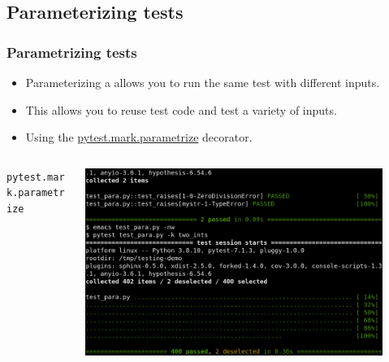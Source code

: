 \documentclass[t]{beamer}
\begin{document}
\subsection{Parameterizing tests}
\begin{frame}[fragile=singleslide]
  \frametitle{Parametrizing tests}

   \begin{itemize}
   \item Parameterizing a allows you to run the same test with different
     inputs.
   \item This allows you to reuse test code and test a variety of inputs.
   \item Using the
     \href{https://docs.pytest.org/en/6.2.x/parametrize.html}{pytest.mark.parametrize}
     decorator.
   \end{itemize}

  \begin{columns}[T]
    \begin{column}{.5\textwidth}
      \vspace{-5pt}
      \begin{exampleblock}{\small \texttt{pytest.mark.parametrize}}
        \inputminted[fontsize=\scriptsize]{python}{code/parametrized_test.py}
      \end{exampleblock}
    \end{column}

    \begin{column}{.5\textwidth}
      \centering
      \href{https://asciinema.org/a/535248}{\includegraphics[width=0.9\textwidth]{figures/pytest_para.png}}
    \end{column}
  \end{columns}

\end{frame}
\end{document}
